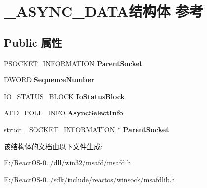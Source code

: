\hypertarget{struct___a_s_y_n_c___d_a_t_a}{}\section{\+\_\+\+A\+S\+Y\+N\+C\+\_\+\+D\+A\+T\+A结构体 参考}
\label{struct___a_s_y_n_c___d_a_t_a}
\subsection*{Public 属性}
\begin{DoxyCompactItemize}
\item 
\mbox{\label{struct___a_s_y_n_c___d_a_t_a_a230ff8d383ca856d670e1706dffcdb6c}} 
\hyperlink{struct___s_o_c_k_e_t___i_n_f_o_r_m_a_t_i_o_n}{P\+S\+O\+C\+K\+E\+T\+\_\+\+I\+N\+F\+O\+R\+M\+A\+T\+I\+ON} {\bfseries Parent\+Socket}
\item 
\mbox{\label{struct___a_s_y_n_c___d_a_t_a_a1719137140bdfb260bc227b257d1aa31}} 
D\+W\+O\+RD {\bfseries Sequence\+Number}
\item 
\mbox{\label{struct___a_s_y_n_c___d_a_t_a_af973a1e580abd7dd350f2dccbd5a40a9}} 
\hyperlink{struct___i_o___s_t_a_t_u_s___b_l_o_c_k}{I\+O\+\_\+\+S\+T\+A\+T\+U\+S\+\_\+\+B\+L\+O\+CK} {\bfseries Io\+Status\+Block}
\item 
\mbox{\label{struct___a_s_y_n_c___d_a_t_a_a1559e8f2cf42b425d206896f64aa8676}} 
\hyperlink{struct___a_f_d___p_o_l_l___i_n_f_o}{A\+F\+D\+\_\+\+P\+O\+L\+L\+\_\+\+I\+N\+FO} {\bfseries Async\+Select\+Info}
\item 
\mbox{\label{struct___a_s_y_n_c___d_a_t_a_a36525b8700514a35f9c8dc2ffb9ed5ad}} 
\hyperlink{interfacestruct}{struct} \hyperlink{struct___s_o_c_k_e_t___i_n_f_o_r_m_a_t_i_o_n}{\+\_\+\+S\+O\+C\+K\+E\+T\+\_\+\+I\+N\+F\+O\+R\+M\+A\+T\+I\+ON} $\ast$ {\bfseries Parent\+Socket}
\end{DoxyCompactItemize}


该结构体的文档由以下文件生成\+:\begin{DoxyCompactItemize}
\item 
E\+:/\+React\+O\+S-\/0../dll/win32/msafd/msafd.\+h\item 
E\+:/\+React\+O\+S-\/0../sdk/include/reactos/winsock/msafdlib.\+h\end{DoxyCompactItemize}
